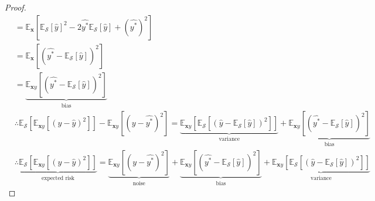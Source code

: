 \documentclass{article}
\begin{document}
\begin{center}
\begin{proof}
\begin{align*}
            &= \mathbb{E}_{\mathbf{x}}\left[\mathbb{E}_{\mathcal{S}}[\hat{y}]^2 - 2\hat{y^*}\mathbb{E}_{\mathcal{S}}[\hat{y}] + (\hat{y^*})^2\right]
            \\
            &= \mathbb{E}_{\mathbf{x}}\left[\left(\hat{y^*} - \mathbb{E}_{\mathcal{S}}[\hat{y}]\right)^2\right]
            \\
            &= \underbrace{\mathbb{E}_{\mathbf{x}y}\left[\left(\hat{y^*} - \mathbb{E}_{\mathcal{S}}[\hat{y}]\right)^2\right]}_{\text{bias}}
            \\
            &\therefore \mathbb{E}_{\mathcal{S}}\left[\mathbb{E}_{\mathbf{x}y}\left[(y - \hat{y})^2\right]\right] - \mathbb{E}_{\mathbf{x}y}\left[(y - \hat{y^*})^2\right] = \underbrace{\mathbb{E}_{\mathbf{x}y}\left[\mathbb{E}_{\mathcal{S}}\left[(\hat{y} - \mathbb{E}_{\mathcal{S}}[\hat{y}])^2\right]\right]}_{\text{variance}} + \underbrace{\mathbb{E}_{\mathbf{x}y}\left[\left(\hat{y^*} - \mathbb{E}_{\mathcal{S}}[\hat{y}]\right)^2\right]}_{\text{bias}}
            \\
            &\therefore \underbrace{\mathbb{E}_{\mathcal{S}}\left[\mathbb{E}_{\mathbf{x}y}\left[(y - \hat{y})^2\right]\right]}_{\text{expected risk}} = \underbrace{\mathbb{E}_{\mathbf{x}y}\left[(y - \hat{y^*})^2\right]}_{\text{noise}} + \underbrace{\mathbb{E}_{\mathbf{x}y}\left[\left(\hat{y^*} - \mathbb{E}_{\mathcal{S}}[\hat{y}]\right)^2\right]}_{\text{bias}} + \underbrace{\mathbb{E}_{\mathbf{x}y}\left[\mathbb{E}_{\mathcal{S}}\left[(\hat{y} - \mathbb{E}_{\mathcal{S}}[\hat{y}])^2\right]\right]}_{\text{variance}}
        \end{align*}
    \end{proof}
\end{center}
\end{document}
